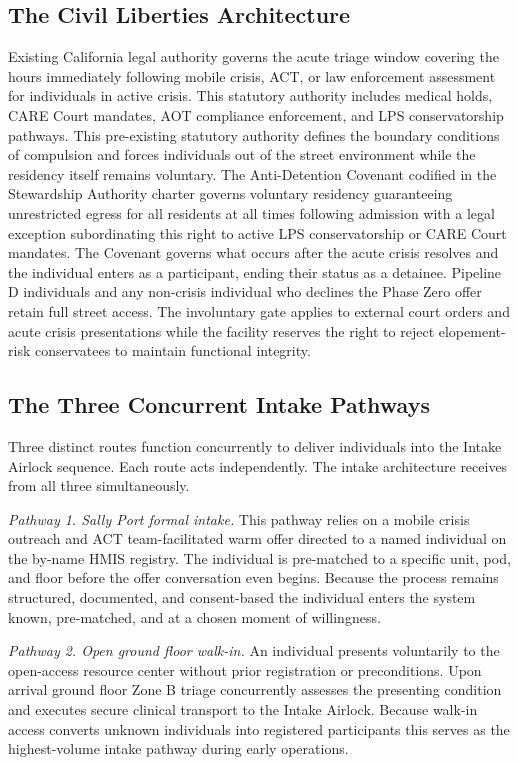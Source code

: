 \documentclass[12pt, letterpaper]{article}
\begin{document}
\subsection{The Civil Liberties Architecture}

Existing California legal authority governs the acute triage window covering the hours immediately following mobile crisis, ACT, or law enforcement assessment for individuals in active crisis. This statutory authority includes medical holds, CARE Court mandates, AOT compliance enforcement, and LPS conservatorship pathways. This pre-existing statutory authority defines the boundary conditions of compulsion and forces individuals out of the street environment while the residency itself remains voluntary. The Anti-Detention Covenant codified in the Stewardship Authority charter governs voluntary residency guaranteeing unrestricted egress for all residents at all times following admission with a legal exception subordinating this right to active LPS conservatorship or CARE Court mandates. The Covenant governs what occurs after the acute crisis resolves and the individual enters as a participant, ending their status as a detainee. Pipeline D individuals and any non-crisis individual who declines the Phase Zero offer retain full street access. The involuntary gate applies to external court orders and acute crisis presentations while the facility reserves the right to reject elopement-risk conservatees to maintain functional integrity.

\subsection{The Three Concurrent Intake Pathways}

Three distinct routes function concurrently to deliver individuals into the Intake Airlock sequence. Each route acts independently. The intake architecture receives from all three simultaneously.

\textit{Pathway 1. Sally Port formal intake.} This pathway relies on a mobile crisis outreach and ACT team-facilitated warm offer directed to a named individual on the by-name HMIS registry. The individual is pre-matched to a specific unit, pod, and floor before the offer conversation even begins. Because the process remains structured, documented, and consent-based the individual enters the system known, pre-matched, and at a chosen moment of willingness.

\textit{Pathway 2. Open ground floor walk-in.} An individual presents voluntarily to the open-access resource center without prior registration or preconditions. Upon arrival ground floor Zone B triage concurrently assesses the presenting condition and executes secure clinical transport to the Intake Airlock. Because walk-in access converts unknown individuals into registered participants this serves as the highest-volume intake pathway during early operations.
\end{document}
